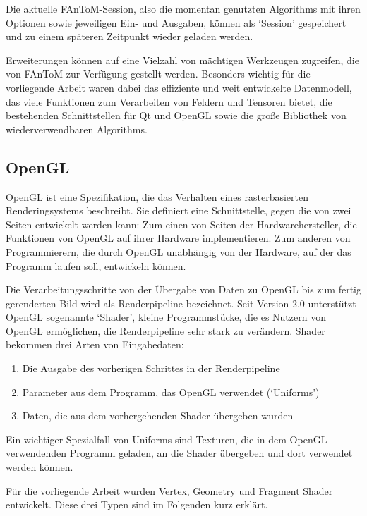 \documentclass[a4paper,fontsize=12pt,toc=bib,halfparskip]{scrartcl}
\begin{document}
Die aktuelle FAnToM-Session, also die momentan genutzten Algorithms mit ihren Optionen sowie jeweiligen Ein- und Ausgaben, k\"onnen als `Session' gespeichert und zu einem sp\"ateren Zeitpunkt wieder geladen werden.

Erweiterungen k\"onnen auf eine Vielzahl von m\"achtigen Werkzeugen zugreifen, die von FAnToM zur Verf\"ugung gestellt werden. Besonders wichtig f\"ur die vorliegende Arbeit waren dabei das effiziente und weit entwickelte Datenmodell, das viele Funktionen zum Verarbeiten von Feldern und Tensoren bietet, die bestehenden Schnittstellen f\"ur Qt und OpenGL sowie die gro{\ss}e Bibliothek von wiederverwendbaren Algorithms.
\subsection{OpenGL}
\label{sec:OpenGL}
OpenGL\cite{openglWebsite} ist eine Spezifikation, die das Verhalten eines rasterbasierten Renderingsystems beschreibt. Sie definiert eine Schnittstelle, gegen die von zwei Seiten entwickelt werden kann: Zum einen von Seiten der Hardwarehersteller, die Funktionen von OpenGL auf ihrer Hardware implementieren. Zum anderen von Programmierern, die durch OpenGL unabh\"angig von der Hardware, auf der das Programm laufen soll, entwickeln k\"onnen. 

Die Verarbeitungsschritte von der \"Ubergabe von Daten zu OpenGL bis zum fertig gerenderten Bild wird als Renderpipeline bezeichnet. Seit Version 2.0 unterst\"utzt OpenGL sogenannte `Shader', kleine Programmst\"ucke, die es Nutzern von OpenGL erm\"oglichen, die Renderpipeline sehr stark zu ver\"andern. Shader bekommen drei Arten von Eingabedaten:

\begin{enumerate}
	\item Die Ausgabe des vorherigen Schrittes in der Renderpipeline
	\item Parameter aus dem Programm, das OpenGL verwendet (`Uniforms')
	\item Daten, die aus dem vorhergehenden Shader \"ubergeben wurden
\end{enumerate}

Ein wichtiger Spezialfall von Uniforms sind Texturen, die in dem OpenGL verwendenden Programm geladen, an die Shader \"ubergeben und dort verwendet werden k\"onnen.

F\"ur die vorliegende Arbeit wurden Vertex, Geometry und Fragment Shader entwickelt. Diese drei Typen sind im Folgenden kurz erkl\"art.
\end{document}
